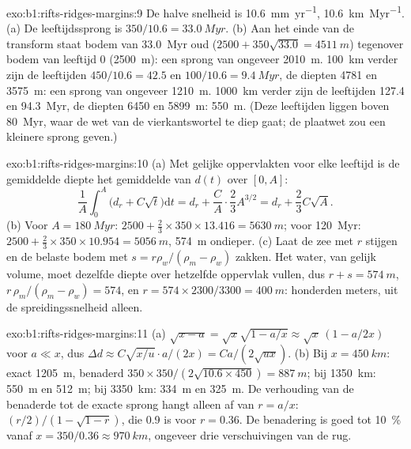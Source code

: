 \begin{solution}{exo:b1:rifts-ridges-margins:9}
De halve snelheid is \qty{10.6}{mm.yr^{-1}}, \qty{10.6}{km.Myr^{-1}}. (a) De leeftijdssprong is $350/10.6 = \qty{33.0}{Myr}$. (b) Aan het einde van de transform staat bodem van \qty{33.0}{Myr} oud ($2500 + 350\sqrt{33.0} = \qty{4511}{m}$) tegenover bodem van leeftijd 0 (\qty{2500}{m}): een sprong van ongeveer \qty{2010}{m}. \qty{100}{km} verder zijn de leeftijden $450/10.6 = 42.5$ en $100/10.6 = \qty{9.4}{Myr}$, de diepten 4781 en \qty{3575}{m}: een sprong van ongeveer \qty{1210}{m}. \qty{1000}{km} verder zijn de leeftijden 127.4 en \qty{94.3}{Myr}, de diepten 6450 en \qty{5899}{m}: \qty{550}{m}. (Deze leeftijden liggen boven \qty{80}{Myr}, waar de wet van de vierkantswortel te diep gaat; de plaatwet zou een kleinere sprong geven.)
\end{solution}

\begin{solution}{exo:b1:rifts-ridges-margins:10}
(a) Met gelijke oppervlakten voor elke leeftijd is de gemiddelde diepte het gemiddelde van $d(t)$ over $[0, A]$:
\[
  \frac1A\int_0^A\bigl(d_r + C\sqrt t\bigr)\mathrm dt = d_r + \frac CA\cdot\frac23A^{3/2}
  = d_r + \frac23C\sqrt A.
\]
(b) Voor $A = \qty{180}{Myr}$: $2500 + \frac23\times350\times13.416 =
\qty{5630}{m}$; voor \qty{120}{Myr}: $2500 + \frac23\times350\times10.954 =
\qty{5056}{m}$, \qty{574}{m} ondieper. (c) Laat de zee met $r$ stijgen en de belaste bodem met $s = r\rho_w/(\rho_m - \rho_w)$ zakken. Het water, van gelijk volume, moet dezelfde diepte over hetzelfde oppervlak vullen, dus $r + s = \qty{574}{m}$,
$r\,\rho_m/(\rho_m - \rho_w) = 574$, en $r = 574\times2300/3300 =
\qty{400}{m}$: honderden meters, uit de spreidingssnelheid alleen.
\end{solution}

\begin{solution}{exo:b1:rifts-ridges-margins:11}
(a) $\sqrt{x - a} = \sqrt x\sqrt{1 - a/x} \approx \sqrt x\,(1 - a/2x)$ voor
$a \ll x$, dus
$\Delta d \approx C\sqrt{x/u}\cdot a/(2x) = Ca/(2\sqrt{ux})$.
(b) Bij $x = \qty{450}{km}$: exact \qty{1205}{m}, benaderd
$350\times350/(2\sqrt{10.6\times450}) = \qty{887}{m}$; bij \qty{1350}{km}:
\qty{550}{m} en \qty{512}{m}; bij \qty{3350}{km}: \qty{334}{m} en
\qty{325}{m}. De verhouding van de benaderde tot de exacte sprong hangt alleen af van $r = a/x$: $(r/2)/(1 - \sqrt{1 - r})$, die 0.9 is voor $r = 0.36$. De benadering is goed tot \qty{10}{\percent} vanaf $x = 350/0.36 \approx
\qty{970}{km}$, ongeveer drie verschuivingen van de rug.
\end{solution}

